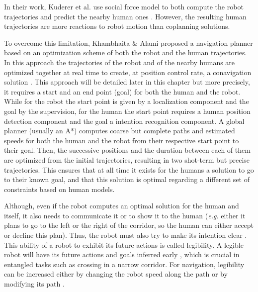 \documentclass[a4paper,11pt,twoside]{StyleThese}
\begin{document}
In their work, Kuderer et al. use social force model to both compute the robot trajectories and predict the nearby human ones \cite{kuderer_feature-based_2012}. However, the resulting human trajectories are more reactions to robot motion than coplanning solutions.

To overcome this limitation, Khambhaita \& Alami proposed a navigation planner based on an optimization scheme of both the robot and the human trajectories. In this approach the trajectories of the robot and of the nearby humans are optimized together at real time to create, at position control rate, a conavigation solution \cite{khambhaita_viewing_2017}. This approach will be detailed later in this chapter but more precisely, it requires a start and an end point (goal) for both the human and the robot. While for the robot the start point is given by a localization component and the goal by the supervision, for the human the start point requires a human position detection component and the goal a intention recognition component. A global planner (usually an A*) computes coarse but complete paths and estimated speeds for both the human and the robot from their respective start point to their goal. Then, the successive positions and the duration between each of them are optimized from the initial trajectories, resulting in two shot-term but precise trajectories. This ensures that at all time it exists for the humans a solution to go to their known goal, and that this solution is optimal regarding a different set of constraints based on human models.

Although, even if the robot computes an optimal solution for the human and itself, it also needs to communicate it or to show it to the human (\textit{e.g.} either it plans to go to the left or the right of the corridor, so the human can either accept or decline this plan). Thus, the robot must also try to make its intention clear \cite{pacchierotti_evaluation_2006}. This ability of a robot to exhibit its future actions is called legibility. A legible robot will have its future actions and goals inferred early \cite{dragan_legibility_2013}, which is crucial in entangled tasks such as crossing in a narrow corridor. For navigation, legibility can be increased either by changing the robot speed along the path \cite{kruse_legible_2012} or by modifying its path \cite{khambhaita_viewing_2017}.
\end{document}
